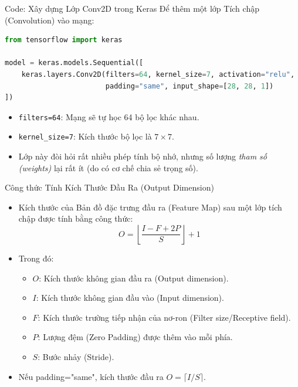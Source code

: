\documentclass[aspectratio=169]{beamer}
\begin{document}
\begin{frame}[fragile]{Code: Xây dựng Lớp Conv2D trong Keras}
    Để thêm một lớp Tích chập (Convolution) vào mạng:
\begin{lstlisting}[language=Python]
from tensorflow import keras

model = keras.models.Sequential([
    keras.layers.Conv2D(filters=64, kernel_size=7, activation="relu",
                        padding="same", input_shape=[28, 28, 1])
])
\end{lstlisting}
    \begin{itemize}
        \item \texttt{filters=64}: Mạng sẽ tự học 64 bộ lọc khác nhau.
        \item \texttt{kernel\_size=7}: Kích thước bộ lọc là $7\times7$.
        \item Lớp này đòi hỏi rất nhiều phép tính bộ nhớ, nhưng số lượng \textit{tham số (weights)} lại rất ít (do có cơ chế chia sẻ trọng số).
    \end{itemize}
\end{frame}

\begin{frame}{Công thức Tính Kích Thước Đầu Ra (Output Dimension)}
    \begin{itemize}
        \item Kích thước của Bản đồ đặc trưng đầu ra (Feature Map) sau một lớp tích chập được tính bằng công thức:
        \begin{equation*}
            O = \left\lfloor \frac{I - F + 2P}{S} \right\rfloor + 1
        \end{equation*}
        \item Trong đó:
        \begin{itemize}
            \item $O$: Kích thước không gian đầu ra (Output dimension).
            \item $I$: Kích thước không gian đầu vào (Input dimension).
            \item $F$: Kích thước trường tiếp nhận của nơ-ron (Filter size/Receptive field).
            \item $P$: Lượng đệm (Zero Padding) được thêm vào mỗi phía.
            \item $S$: Bước nhảy (Stride).
        \end{itemize}
        \item Nếu padding="same", kích thước đầu ra $O = \lceil I / S \rceil$.
    \end{itemize}
\end{frame}
\end{document}
